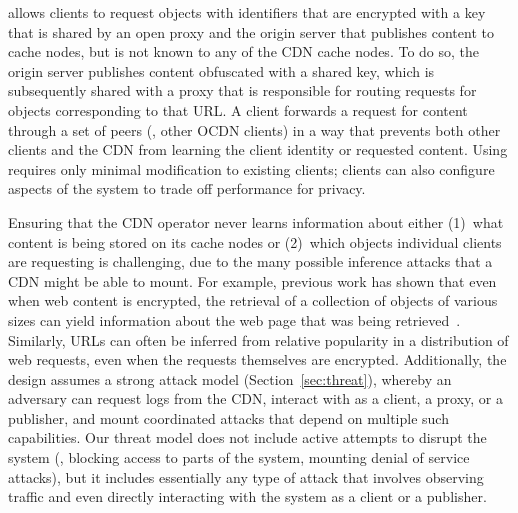 \system{} allows clients to request objects with identifiers that
are encrypted with a key that is shared by an open proxy and the origin server
that publishes content to cache nodes, but is not known to any of the CDN
cache nodes.  To do so, the origin server publishes content obfuscated with a
shared key, which is subsequently shared with a proxy that is responsible for
routing requests for objects corresponding to that URL.  A client forwards a
request for content through a set of peers (\ie, other OCDN clients) in a way
that prevents both other clients and the CDN from learning the client
identity or requested content.  Using \system{} requires only minimal modification to existing clients; clients can also configure aspects of the system to trade off performance for privacy.

Ensuring that the CDN operator never learns information about either (1)~what
content is being stored on its cache nodes or (2)~which objects individual
clients are requesting is challenging, due to the many possible inference
attacks that a CDN might be able to mount. For example, previous work has
shown that even when web content is encrypted, the retrieval of a collection
of objects of various sizes can yield information about the web page that was
being retrieved~\cite{panchenko2016website, cai2012touching}. Similarly, URLs
can often be inferred from relative popularity in a distribution of web
requests, even when the requests themselves are encrypted. Additionally, the
\system{} design assumes a strong attack model (Section~\ref{sec:threat}),
whereby an adversary can request logs from the CDN, interact with \system{} as
a client, a proxy, or a publisher, and mount coordinated attacks that depend on
multiple such capabilities. Our threat model does not include active attempts
to disrupt the system (\eg, blocking access to parts of the system, mounting
denial of service attacks), but it includes essentially any type of attack
that involves observing traffic and even directly interacting with the system
as a client or a publisher.

